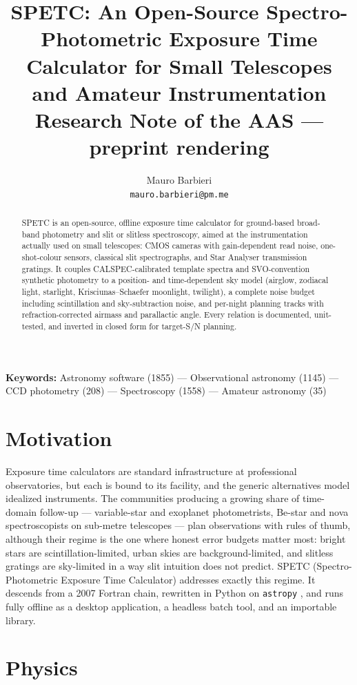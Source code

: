 \documentclass[11pt, a4paper]{article}
\title{SPETC: An Open-Source Spectro-Photometric Exposure Time Calculator
for Small Telescopes and Amateur Instrumentation\\[4pt]
{\normalsize Research Note of the AAS --- preprint rendering}}
\author{Mauro Barbieri\\\small\texttt{mauro.barbieri@pm.me}}
\date{}
\begin{document}
\maketitle

\noindent\textbf{Keywords:} Astronomy software (1855) --- Observational
astronomy (1145) --- CCD photometry (208) --- Spectroscopy (1558) ---
Amateur astronomy (35)

\begin{abstract}
SPETC is an open-source, offline exposure time calculator for ground-based
broad-band photometry and slit or slitless spectroscopy, aimed at the
instrumentation actually used on small telescopes: CMOS cameras with
gain-dependent read noise, one-shot-colour sensors, classical slit
spectrographs, and Star Analyser transmission gratings. It couples
CALSPEC-calibrated template spectra and SVO-convention synthetic photometry
to a position- and time-dependent sky model (airglow, zodiacal light,
starlight, Krisciunas--Schaefer moonlight, twilight), a complete noise
budget including scintillation and sky-subtraction noise, and per-night
planning tracks with refraction-corrected airmass and parallactic angle.
Every relation is documented, unit-tested, and inverted in closed form for
target-S/N planning.
\end{abstract}

\section{Motivation}

Exposure time calculators are standard infrastructure at professional
observatories, but each is bound to its facility, and the generic
alternatives model idealized instruments. The communities producing a
growing share of time-domain follow-up --- variable-star and exoplanet
photometrists, Be-star and nova spectroscopists on sub-metre telescopes ---
plan observations with rules of thumb, although their regime is the one
where honest error budgets matter most: bright stars are
scintillation-limited, urban skies are background-limited, and slitless
gratings are sky-limited in a way slit intuition does not predict. SPETC
(Spectro-Photometric Exposure Time Calculator) addresses exactly this
regime. It descends from a 2007 Fortran chain, rewritten in Python on
\texttt{astropy} \citep{astropy2022}, and runs fully offline as a desktop
application, a headless batch tool, and an importable library.

\section{Physics}
\end{document}
